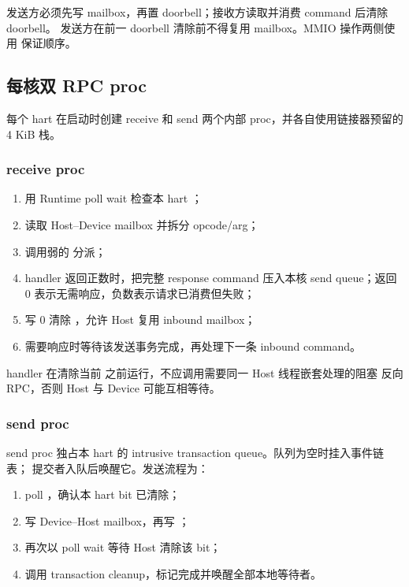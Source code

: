 \documentclass[../dayan_kernel_manual.tex]{subfiles}
\begin{document}
发送方必须先写 mailbox，再置 doorbell；接收方读取并消费 command 后清除 doorbell。
发送方在前一 doorbell 清除前不得复用 mailbox。MMIO 操作两侧使用
 保证顺序。

\subsection{每核双 RPC proc}

每个 hart 在启动时创建 receive 和 send 两个内部 proc，并各自使用链接器预留的
4 KiB 栈。

\subsubsection{receive proc}

\begin{enumerate}
  \item 用 Runtime poll wait 检查本 hart ；
  \item 读取 Host--Device mailbox 并拆分 opcode/arg；
  \item 调用弱的  分派；
  \item handler 返回正数时，把完整 response command 压入本核 send queue；返回 0
        表示无需响应，负数表示请求已消费但失败；
  \item 写 0 清除 ，允许 Host 复用 inbound mailbox；
  \item 需要响应时等待该发送事务完成，再处理下一条 inbound command。
\end{enumerate}

handler 在清除当前  之前运行，不应调用需要同一 Host 线程嵌套处理的阻塞
反向 RPC，否则 Host 与 Device 可能互相等待。

\subsubsection{send proc}

send proc 独占本 hart 的 intrusive transaction queue。队列为空时挂入事件链表；
提交者入队后唤醒它。发送流程为：

\begin{enumerate}
  \item poll ，确认本 hart bit 已清除；
  \item 写 Device--Host mailbox，再写 ；
  \item 再次以 poll wait 等待 Host 清除该 bit；
  \item 调用 transaction cleanup，标记完成并唤醒全部本地等待者。
\end{enumerate}
\end{document}
